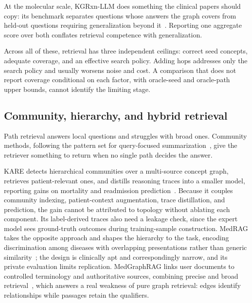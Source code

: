 At the molecular scale, KGRxn-LLM does something the clinical papers should copy: its benchmark separates questions whose answers the graph covers from held-out questions requiring generalization beyond it~\cite{liu2026kgrxn}. Reporting one aggregate score over both conflates retrieval competence with generalization.

Across all of these, retrieval has three independent ceilings: correct seed concepts, adequate coverage, and an effective search policy. Adding hops addresses only the search policy and usually worsens noise and cost. A comparison that does not report coverage conditional on each factor, with oracle-seed and oracle-path upper bounds, cannot identify the limiting stage.

\subsection{Community, hierarchy, and hybrid retrieval}

Path retrieval answers local questions and struggles with broad ones. Community methods, following the pattern set for query-focused summarization~\cite{edge2024graphrag}, give the retriever something to return when no single path decides the answer.

KARE detects hierarchical communities over a multi-source concept graph, retrieves patient-relevant ones, and distills reasoning traces into a smaller model, reporting gains on mortality and readmission prediction~\cite{jiang2025kare}. Because it couples community indexing, patient-context augmentation, trace distillation, and prediction, the gain cannot be attributed to topology without ablating each component. Its label-derived traces also need a leakage check, since the expert model sees ground-truth outcomes during training-sample construction. MedRAG takes the opposite approach and shapes the hierarchy to the task, encoding discrimination among diseases with overlapping presentations rather than generic similarity~\cite{zhao2025medrag}; the design is clinically apt and correspondingly narrow, and its private evaluation limits replication. MedGraphRAG links user documents to controlled terminology and authoritative sources, combining precise and broad retrieval~\cite{wu2025medgraphrag}, which answers a real weakness of pure graph retrieval: edges identify relationships while passages retain the qualifiers. 

